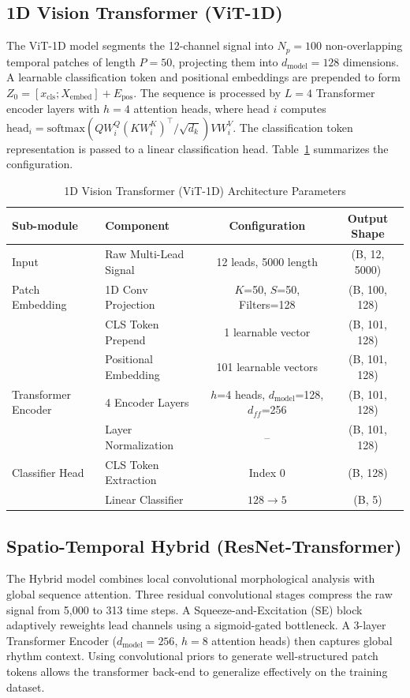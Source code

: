 \documentclass[14pt]{extarticle}
\begin{document}
\subsection{1D Vision Transformer (ViT-1D)}
The ViT-1D model \cite{vaid2023foundational, vaswani2017attention} segments the 12-channel signal into $N_p = 100$ non-overlapping temporal patches of length $P = 50$, projecting them into $d_{\text{model}} = 128$ dimensions. A learnable classification token and positional embeddings are prepended to form $Z_0 = [x_{\text{cls}}; X_{\text{embed}}] + E_{\text{pos}}$. The sequence is processed by $L = 4$ Transformer encoder layers with $h = 4$ attention heads, where head $i$ computes $\text{head}_i = \text{softmax}(QW_i^Q(KW_i^K)^\top / \sqrt{d_k})VW_i^V$. The classification token representation is passed to a linear classification head. Table~\ref{tab:vit_arch} summarizes the configuration.

\begin{table}[H]
\caption{1D Vision Transformer (ViT-1D) Architecture Parameters}
\label{tab:vit_arch}
\centering
\begin{tabular}{|l|l|c|c|}
\hline
\textbf{Sub-module} & \textbf{Component} & \textbf{Configuration} & \textbf{Output Shape} \\
\hline
Input & Raw Multi-Lead Signal & 12 leads, 5000 length & (B, 12, 5000) \\
\hline
Patch Embedding & 1D Conv Projection & $K$=50, $S$=50, Filters=128 & (B, 100, 128) \\
\hline
 & CLS Token Prepend & 1 learnable vector & (B, 101, 128) \\
\hline
 & Positional Embedding & 101 learnable vectors & (B, 101, 128) \\
\hline
Transformer Encoder & 4 Encoder Layers & $h$=4 heads, $d_{\text{model}}$=128, $d_{ff}$=256 & (B, 101, 128) \\
\hline
 & Layer Normalization & -- & (B, 101, 128) \\
\hline
Classifier Head & CLS Token Extraction & Index 0 & (B, 128) \\
\hline
 & Linear Classifier & $128\to5$ & (B, 5) \\
\hline
\end{tabular}
\end{table}

\subsection{Spatio-Temporal Hybrid (ResNet-Transformer)}
The Hybrid model \cite{moody2025foundation} combines local convolutional morphological analysis with global sequence attention. Three residual convolutional stages compress the raw signal from 5{,}000 to 313 time steps. A Squeeze-and-Excitation (SE) block adaptively reweights lead channels using a sigmoid-gated bottleneck. A 3-layer Transformer Encoder ($d_{\text{model}}=256$, $h=8$ attention heads) then captures global rhythm context. Using convolutional priors to generate well-structured patch tokens allows the transformer back-end to generalize effectively on the training dataset.
\end{document}
